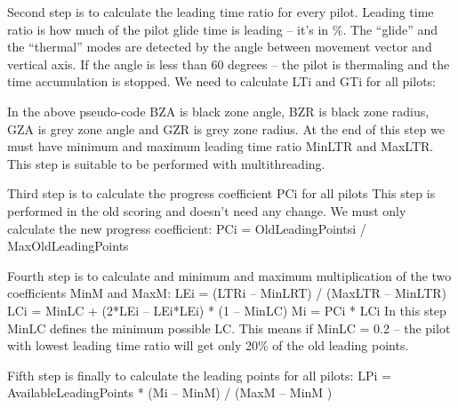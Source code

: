 \documentclass[gap.tex]{subfiles}
\begin{document}
Second step is to calculate the leading time ratio for every pilot. Leading
time ratio is how much of the pilot glide time is leading – it’s in \%. The
“glide” and the “thermal” modes are detected by the angle between movement
vector and vertical axis. If the angle is less than 60 degrees – the pilot is
thermaling and the time accumulation is stopped. We need to calculate LTi and
GTi for all pilots:

In the above pseudo-code BZA is black zone angle, BZR is black zone radius, GZA
is grey zone angle and GZR is grey zone radius. At the end of this step we must
have minimum and maximum leading time ratio MinLTR and MaxLTR. This step is
suitable to be performed with multithreading.

Third step is to calculate the progress coefficient PCi for all pilots This
step is performed in the old scoring and doesn’t need any change. We must only
calculate the new progress coefficient: PCi = OldLeadingPointsi
/ MaxOldLeadingPoints

Fourth step is to calculate and minimum and maximum multiplication of the two
coefficients MinM and MaxM: LEi = (LTRi – MinLRT) / (MaxLTR – MinLTR) LCi
= MinLC + (2*LEi – LEi*LEi) * (1 – MinLC) Mi = PCi * LCi In this step MinLC
defines the minimum possible LC. This means if MinLC = 0.2 – the pilot with
lowest leading time ratio will get only 20\% of the old leading points.

Fifth step is finally to calculate the leading points for all pilots: LPi
= AvailableLeadingPoints * (Mi – MinM) / (MaxM – MinM )
\end{document}
